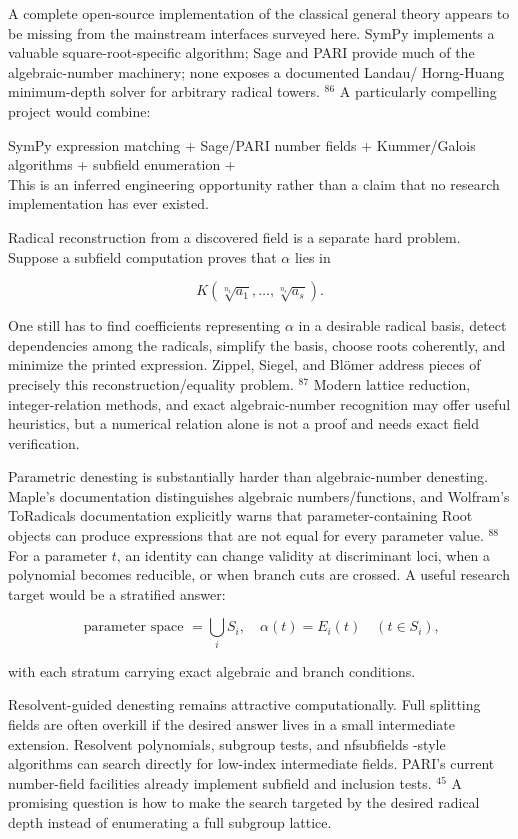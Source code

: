 \documentclass[10pt]{article}
\begin{document}
A complete open-source implementation of the classical general theory appears to be missing from the mainstream interfaces surveyed here. SymPy implements a valuable square-root-specific algorithm; Sage and PARI provide much of the algebraic-number machinery; none exposes a documented Landau/ Horng-Huang minimum-depth solver for arbitrary radical towers. ${ }^{86}$ A particularly compelling project would combine:

SymPy expression matching + Sage/PARI number fields + Kummer/Galois algorithms + subfield enumeration +\\
This is an inferred engineering opportunity rather than a claim that no research implementation has ever existed.

Radical reconstruction from a discovered field is a separate hard problem. Suppose a subfield computation proves that $\alpha$ lies in

$$
K\left(\sqrt[n_{1}]{a_{1}}, \ldots, \sqrt[n_{s}]{a_{s}}\right) .
$$

One still has to find coefficients representing $\alpha$ in a desirable radical basis, detect dependencies among the radicals, simplify the basis, choose roots coherently, and minimize the printed expression. Zippel, Siegel, and Blömer address pieces of precisely this reconstruction/equality problem. ${ }^{87}$ Modern lattice reduction, integer-relation methods, and exact algebraic-number recognition may offer useful heuristics, but a numerical relation alone is not a proof and needs exact field verification.

Parametric denesting is substantially harder than algebraic-number denesting. Maple's documentation distinguishes algebraic numbers/functions, and Wolfram's ToRadicals documentation explicitly warns that parameter-containing Root objects can produce expressions that are not equal for every parameter value. ${ }^{88}$ For a parameter $t$, an identity can change validity at discriminant loci, when a polynomial becomes reducible, or when branch cuts are crossed. A useful research target would be a stratified answer:

$$
\text { parameter space }=\bigcup_{i} S_{i}, \quad \alpha(t)=E_{i}(t) \quad\left(t \in S_{i}\right),
$$

with each stratum carrying exact algebraic and branch conditions.

Resolvent-guided denesting remains attractive computationally. Full splitting fields are often overkill if the desired answer lives in a small intermediate extension. Resolvent polynomials, subgroup tests, and nfsubfields -style algorithms can search directly for low-index intermediate fields. PARI's current number-field facilities already implement subfield and inclusion tests. ${ }^{45}$ A promising question is how to make the search targeted by the desired radical depth instead of enumerating a full subgroup lattice.
\end{document}

